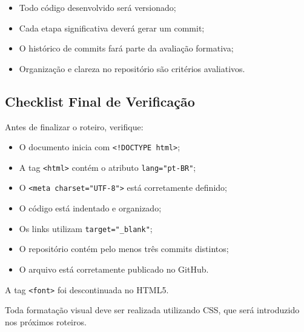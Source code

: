 \documentclass[12pt,a4paper]{article}
\begin{document}
\begin{boxAtividade}

\begin{itemize}
\item Todo código desenvolvido será versionado;
\item Cada etapa significativa deverá gerar um commit;
\item O histórico de commits fará parte da avaliação formativa;
\item Organização e clareza no repositório são critérios avaliativos.
\end{itemize}

\end{boxAtividade}

\subsection{Checklist Final de Verificação}

\begin{boxAtividade}

Antes de finalizar o roteiro, verifique:

\begin{itemize}
\item O documento inicia com \texttt{<!DOCTYPE html>};
\item A tag \texttt{<html>} contém o atributo \texttt{lang="pt-BR"};
\item O \texttt{<meta charset="UTF-8">} está corretamente definido;
\item O código está indentado e organizado;
\item Os links utilizam \texttt{target="\_blank"};
\item O repositório contém pelo menos três commits distintos;
\item O arquivo está corretamente publicado no GitHub.
\end{itemize}

\end{boxAtividade}

\vspace{0.5cm}

\begin{boxAtividade}

A tag \texttt{<font>} foi descontinuada no HTML5.

Toda formatação visual deve ser realizada utilizando CSS, que será introduzido nos próximos roteiros.

\end{boxAtividade}
\end{document}
